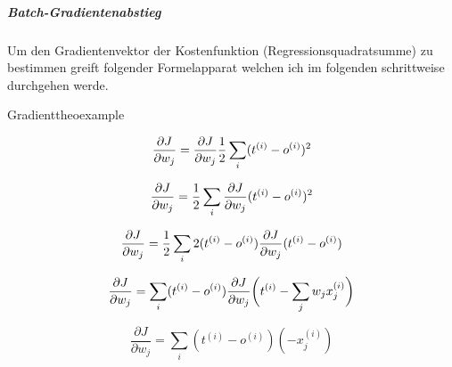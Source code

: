 \vspace{1cm}

\subparagraph{Batch-Gradientenabstieg}
Um den Gradientenvektor der Kostenfunktion (Regressionsquadratsumme) zu bestimmen greift folgender Formelapparat welchen ich im folgenden schrittweise durchgehen werde.

\vspace{2 mm}
\begin{minipage}{\textwidth}
\begin{myderivation}{Gradient}{theoexample} \label{deri:grad}

\begin{equation} \label{eq:gr1}
\frac{\partial J}{\partial w_j} = \frac{\partial J}{\partial w_j} \frac{1}{2} \sum_i  (t^{(i)} - o^{(i)})^2 \\
\end{equation}

\begin{equation} \label{eq:gr2}
\frac{\partial J}{\partial w_j} = \frac{1}{2} \sum_i \frac{\partial J}{\partial w_j} (t^{(i)} - o^{(i)})^2 \\
\end{equation}

\begin{equation} \label{eq:gr3}
\frac{\partial J}{\partial w_j} = \frac{1}{2} \sum_i 2 (t^{(i)} - o^{(i)}) \frac{\partial J}{\partial w_j} (t^{(i)} - o^{(i)}) \\
\end{equation}

\begin{equation} \label{eq:gr4}
\frac{\partial J}{\partial w_j} = \sum_i (t^{(i)} - o^{(i)}) \frac{\partial J}{\partial w_j} \bigg(t^{(i)} - \sum_j w_j x^{(i)}_{j}\bigg) \\
\end{equation}

\begin{equation} \label{eq:gr5}
\frac{\partial J}{\partial w_j} = \sum_i  (t^{(i)} - o^{(i)})(-x^{(i)}_{j})
\end{equation}

\end{myderivation}
\end{minipage}



